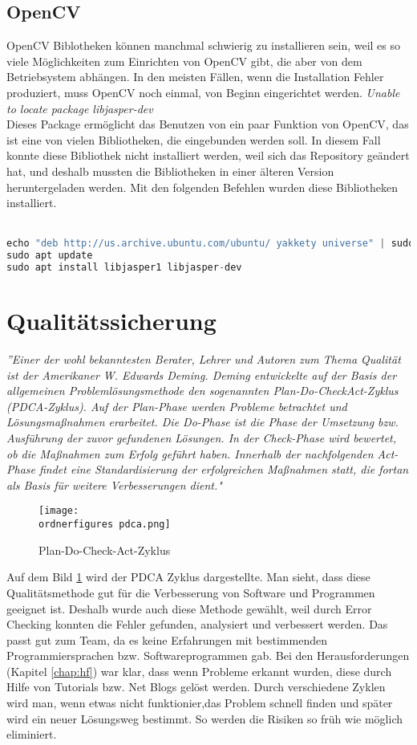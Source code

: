 \subsection{OpenCV}
OpenCV Biblotheken können manchmal schwierig zu installieren sein, weil es so viele Möglichkeiten zum Einrichten von OpenCV gibt, die aber von dem Betriebsystem abhängen. In den meisten Fällen, wenn die Installation Fehler produziert, muss OpenCV noch einmal, von Beginn eingerichtet werden.
\bigbreak
\textit{Unable to locate package libjasper-dev}\\
Dieses Package ermöglicht das Benutzen von ein paar Funktion von OpenCV, das ist eine von vielen Bibliotheken, die eingebunden werden soll. In diesem Fall konnte diese Bibliothek nicht installiert werden, weil sich das Repository geändert hat, und deshalb mussten die Bibliotheken in einer älteren Version heruntergeladen werden. Mit den folgenden Befehlen wurden diese Bibliotheken installiert.\\\\
\begin{lstlisting}[language=Python]
echo "deb http://us.archive.ubuntu.com/ubuntu/ yakkety universe" | sudo tee -a /etc/apt/sources.list
sudo apt update
sudo apt install libjasper1 libjasper-dev
\end{lstlisting}
\section{Qualitätssicherung}
\textit{''Einer der wohl bekanntesten Berater, Lehrer und Autoren zum Thema Qualität ist der Amerikaner W. Edwards Deming. Deming
entwickelte auf der Basis der allgemeinen Problemlösungsmethode den sogenannten Plan-Do-CheckAct-Zyklus (PDCA-Zyklus). Auf der Plan-Phase werden Probleme betrachtet und Lösungsmaßnahmen
erarbeitet. Die Do-Phase ist die Phase der Umsetzung bzw. Ausführung der zuvor gefundenen
Lösungen. In der Check-Phase wird bewertet, ob die Maßnahmen zum Erfolg geführt haben.
Innerhalb der nachfolgenden Act-Phase findet eine Standardisierung der erfolgreichen Maßnahmen
statt, die fortan als Basis für weitere Verbesserungen dient."}\cite{PDCA-Zyklus}
\bigbreak 
\begin{figure}[!htb]
  \centering
    \texttt{[image: \\ordnerfigures pdca.png]}
      \caption{Plan-Do-Check-Act-Zyklus \cite{PDCA-Zyklus}}
    \label{fig:pdca}
\end{figure}
Auf dem Bild \ref{fig:pdca} wird der PDCA Zyklus dargestellte. Man sieht, dass diese Qualitätsmethode gut für die Verbesserung von Software und Programmen geeignet ist. Deshalb wurde auch diese Methode gewählt, weil durch Error Checking konnten die Fehler gefunden, analysiert und verbessert werden. Das passt gut zum Team, da es keine Erfahrungen mit bestimmenden Programmiersprachen bzw. Softwareprogrammen gab.
\bigbreak
Bei den Herausforderungen (Kapitel \ref{chap:hf}) war klar, dass wenn Probleme erkannt wurden, diese durch Hilfe von Tutorials bzw. Net Blogs gelöst werden. Durch verschiedene Zyklen wird man, wenn etwas nicht funktionier,das Problem  schnell finden und später wird ein neuer Lösungsweg bestimmt. So werden die Risiken so früh wie möglich eliminiert.

